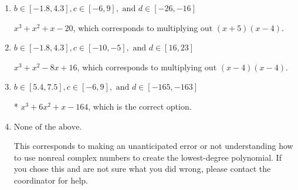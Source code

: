 \documentclass{extbook}[14pt]
\begin{document}
\begin{enumerate}
{\begin{enumerate}[label=\Alph*.]
$x^{3} -6 x^{2} +x + 164$, which corresponds to multiplying out $(x-(-5 + 4 i))(x-(-5 - 4 i))(x + 4)$.
\item \( b \in [-1.8, 4.3], c \in [-6, 9], \text{ and } d \in [-26, -16] \)

$x^{3} + x^{2} +x -20$, which corresponds to multiplying out $(x + 5)(x -4)$.
\item \( b \in [-1.8, 4.3], c \in [-10, -5], \text{ and } d \in [16, 23] \)

$x^{3} + x^{2} -8 x + 16$, which corresponds to multiplying out $(x -4)(x -4)$.
\item \( b \in [5.4, 7.5], c \in [-6, 9], \text{ and } d \in [-165, -163] \)

* $x^{3} +6 x^{2} +x -164$, which is the correct option.
\item \( \text{None of the above.} \)

This corresponds to making an unanticipated error or not understanding how to use nonreal complex numbers to create the lowest-degree polynomial. If you chose this and are not sure what you did wrong, please contact the coordinator for help.
\end{enumerate}

}
\end{enumerate}
\end{document}
